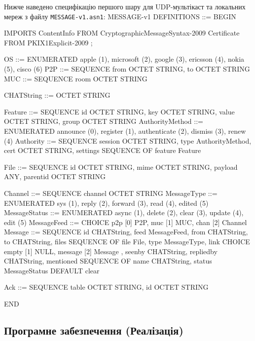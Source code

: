 \documentclass{article}
\let\originalfootnotesize\footnotesize
\let\oldverbatim\verbatim
\let\oldendverbatim\endverbatim
\renewenvironment{verbatim}{\originalfootnotesize\oldverbatim}{\oldendverbatim}
\begin{document}
Нижче наведено специфікацію першого шару для UDP-мультікаст та локальних мереж з файлу \texttt{MESSAGE-v1.asn1}:
\begin{verbatim}
MESSAGE-v1 DEFINITIONS ::= BEGIN

    IMPORTS ContentInfo FROM CryptographicMessageSyntax-2009
            Certificate FROM PKIX1Explicit-2009 ;

    OS  ::= ENUMERATED { apple (1), microsoft (2), google (3),
                         ericsson (4), nokia (5), cisco (6) }
    P2P ::= SEQUENCE { from OCTET STRING, to OCTET STRING }
    MUC ::= SEQUENCE { room OCTET STRING }

    CHATString ::= OCTET STRING

    Feature ::= SEQUENCE { id OCTET STRING, key OCTET STRING, 
                           value OCTET STRING, group OCTET STRING }
    AuthorityMethod ::= ENUMERATED { announce (0), register (1),
                                     authenticate (2), dismiss (3),
                                     renew (4) }
    Authority ::= SEQUENCE {
       session OCTET STRING,
       type AuthorityMethod,
       cert OCTET STRING,
       settings SEQUENCE OF feature Feature }

    File ::= SEQUENCE {
       id OCTET STRING,
       mime OCTET STRING,
       payload ANY,
       parentid OCTET STRING }

    Channel ::= SEQUENCE { channel OCTET STRING }
    MessageType ::= ENUMERATED { sys (1), reply (2), forward (3), 
                                 read (4), edited (5) }
    MessageStatus ::= ENUMERATED { async (1), delete (2), clear (3), 
                                   update (4), edit (5) }
    MessageFeed ::= CHOICE { p2p [0] P2P, muc [1] MUC, chan [2] Channel }
    Message ::= SEQUENCE {
       id CHATString,
       feed MessageFeed,
       from CHATString,
       to CHATString,
       files SEQUENCE OF file File,
       type MessageType,
       link CHOICE { empty [1] NULL, message [2] Message },
       seenby CHATString,
       repliedby CHATString,
       mentioned SEQUENCE OF name CHATString,
       status MessageStatus DEFAULT clear }

    Ack ::= SEQUENCE { table OCTET STRING, id OCTET STRING }

END
\end{verbatim}

\subsection{Програмне забезпечення (Реалізація)}
\end{document}
